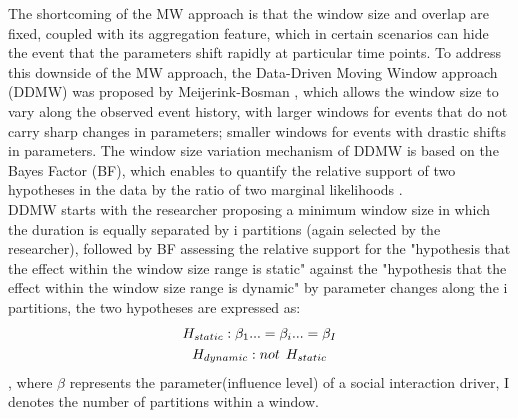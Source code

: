 \documentclass[]{interact}
\theoremstyle{plain}%
\theoremstyle{definition}
\theoremstyle{remark}
\begin{document}
The shortcoming of the MW approach is that the window size and overlap are fixed, coupled with its aggregation feature, which in certain scenarios can hide the event that the parameters shift rapidly at particular time points. To address this downside of the MW approach, the Data-Driven Moving Window approach (DDMW) was proposed by Meijerink-Bosman \cite{meijerink-bosmanDynamicRelationalEvent2022}, which allows the window size to vary along the observed event history, with larger windows for events that do not carry sharp changes in parameters; smaller windows for events with drastic shifts in parameters. The window size variation mechanism of DDMW is based on the Bayes Factor (BF), which enables to quantify the relative support of two hypotheses in the data by the ratio of two marginal likelihoods \cite{guApproximatedAdjustedFractional2018}. \\

DDMW starts with the researcher proposing a minimum window size in which the duration is equally separated by i partitions (again selected by the researcher), followed by BF assessing the relative support for the "hypothesis that the effect within the window size range is static" against the "hypothesis that the effect within the window size range is dynamic" by parameter changes along the i partitions, the two hypotheses are expressed as:
\begin{gather} \label{4, 5}
	H_{static}: \beta_1... = \beta_i... = \beta_I \\ 
	H_{dynamic}: not\hspace{0.15cm} H_{static}
\end{gather} 
, where $\beta$ represents the parameter(influence level) of a social interaction driver, I denotes the number of partitions within a window.\\
\end{document}
